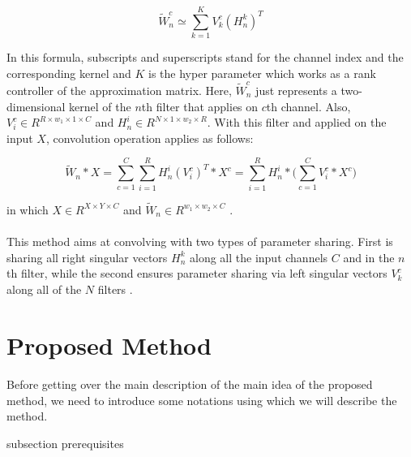 \documentclass{report}
\begin{document}
\begin{equation*}
\tilde{W}^{c}_{n} \simeq \sum ^{K}_{k=1} V^{c} _{k}(H^{k}_{n})^{T}
\end{equation*}


In this formula, subscripts and superscripts stand for the channel index and the corresponding kernel and $K$ is the hyper parameter which works as a rank controller of the approximation matrix. Here,   $\tilde{W}^{c}_{n} $ just represents a two-dimensional kernel of the $n$th filter that applies on $c$th channel. Also, 
$ V^{c} _{i}\in R^{R\times w_1\times 1\times C}$ 
and
$ H^{i}_{n}\in R^{N\times 1\times w_2\times R} $.
With this filter and applied on the input $X$, convolution operation applies as follows:



\begin{equation*}
\tilde{W}_{n}* X = \sum^{C}_{c=1}\sum^{R}_{i=1}H_{n}^{i}(V_{i}^{c})^T*X^c = \sum^{R}_{i=1}H_{n}^{i} *\bigg( \sum^{C}_{c=1}V_{i}^{c}*X^c\bigg)
\end{equation*}

in which 
$X\in R^{X\times Y\times C}  $
and
$\tilde{W}_{n}\in R^{w_1\times w_2\times C}$
.

\paragraph*{}
This method aims at convolving with two types of parameter sharing. First is sharing all right singular vectors $ H^{k}_{n} $ along all the input channels $C$ and in the $n$th filter, while the second ensures parameter sharing via left singular vectors $ V^{c} _{k} $ along all of the $N$ filters
\cite{convop1}
.










\section{
	Proposed Method
}
\paragraph*{}
Before getting over the main description of the main idea of the proposed method, we need to introduce some notations using which we will describe the method.

subsection{
	prerequisites
}
\end{document}
